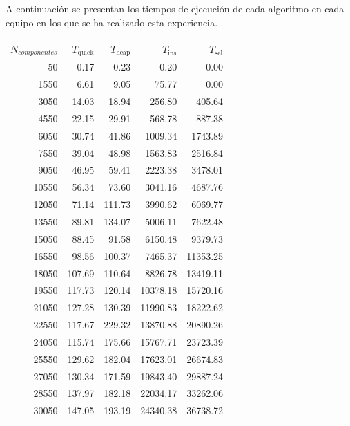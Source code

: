 \documentclass{homework}
\begin{document}
    A continuación se presentan los tiempos de ejecución de cada algoritmo en cada equipo en los que se ha realizado
    esta experiencia. 

    \begin{table}[H]
        \footnotesize
        \centering
        \begin{tabular}{|r|r|r|r|r|}
            \hline
            $N_{componentes}$ & $T_{\text{quick}}$ & $T_{\text{heap}}$ & $T_{\text{ins}}$ & $T_{\text{sel}}$ \\
            \hline
            50 & 0.17 & 0.23 & 0.20 & 0.00 \\ 
            1550 & 6.61 & 9.05 & 75.77 & 0.00 \\ 
            3050 & 14.03 & 18.94 & 256.80 & 405.64 \\ 
            4550 & 22.15 & 29.91 & 568.78 & 887.38 \\ 
            6050 & 30.74 & 41.86 & 1009.34 & 1743.89 \\ 
            7550 & 39.04 & 48.98 & 1563.83 & 2516.84 \\ 
            9050 & 46.95 & 59.41 & 2223.38 & 3478.01 \\ 
            10550 & 56.34 & 73.60 & 3041.16 & 4687.76 \\ 
            12050 & 71.14 & 111.73 & 3990.62 & 6069.77 \\ 
            13550 & 89.81 & 134.07 & 5006.11 & 7622.48 \\ 
            15050 & 88.45 & 91.58 & 6150.48 & 9379.73 \\ 
            16550 & 98.56 & 100.37 & 7465.37 & 11353.25 \\ 
            18050 & 107.69 & 110.64 & 8826.78 & 13419.11 \\ 
            19550 & 117.73 & 120.14 & 10378.18 & 15720.16 \\ 
            21050 & 127.28 & 130.39 & 11990.83 & 18222.62 \\ 
            22550 & 117.67 & 229.32 & 13870.88 & 20890.26 \\ 
            24050 & 115.74 & 175.66 & 15767.71 & 23723.39 \\ 
            25550 & 129.62 & 182.04 & 17623.01 & 26674.83 \\ 
            27050 & 130.34 & 171.59 & 19843.40 & 29887.24 \\ 
            28550 & 137.97 & 182.18 & 22034.17 & 33262.06 \\ 
            30050 & 147.05 & 193.19 & 24340.38 & 36738.72 \\ 

\end{tabular}
\end{table}
\end{document}
